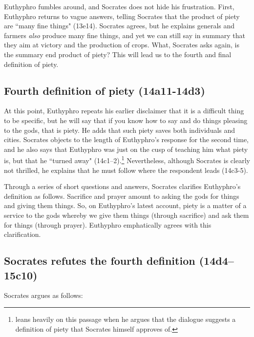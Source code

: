 \documentclass[11pt]{article}
\begin{document}
Euthyphro fumbles around, and Socrates does not hide his frustration.  First, Euthyphro returns to vague answers, telling Socrates that the product of piety are ``many fine things" (13e14).  Socrates agrees, but he explains generals and farmers \emph{also} produce many fine things, and yet we can still say in summary that they aim at victory and the production of crops.  What, Socrates asks again, is the summary end product of piety?  This will lead us to the fourth and final definition of piety.

\subsection{Fourth definition of piety (14a11-14d3)}

At this point, Euthyphro repeats his earlier disclaimer that it is a difficult thing to be specific, but he will say that if you know how to say and do things pleasing to the gods, that is piety.  He adds that such piety saves both individuals and cities.  Socrates objects to the length of Euthyphro's response for the second time, and he also says that Euthyphro was just on the cusp of teaching him what piety is, but that he ``turned away" (14c1--2).\footnote{\citet{mcpherran1992} leans heavily on this passage when he argues that the dialogue suggests a definition of piety that Socrates himself approves of.}  Nevertheless, although Socrates is clearly not thrilled, he explains that he must follow where the respondent leads (14c3-5).

Through a series of short questions and answers, Socrates clarifies Euthyphro's definition as follows.  Sacrifice and prayer amount to asking the gods for things and giving them things.  So, on Euthyphro's latest account, piety is a matter of a service to the gods whereby we give them things (through sacrifice) and ask them for things (through prayer).  Euthyphro emphatically agrees with this clarification.

\subsection{Socrates refutes the fourth definition (14d4--15c10)}

Socrates argues as follows:
\end{document}
